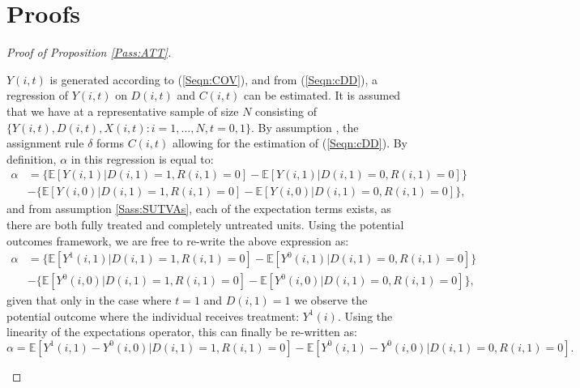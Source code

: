 \section{Proofs}
\renewcommand{\qedsymbol}{$\blacksquare$}
\begin{proof}[Proof of Proposition \ref{Pass:ATT}]
\begin{footnotesize}
$Y(i,t)$ is generated according to (\ref{Seqn:COV}), and from (\ref{Seqn:cDD}),
a regression of $Y(i,t)$ on $D(i,t)$ and $C(i,t)$ can be estimated.  It is 
assumed that we have at a representative sample of size $N$ consisting of 
$\{Y(i,t),D(i,t),X(i,t): i=1, \ldots, N, t=0, 1\}$.  By assumption 
, the assignment rule $\delta$ forms $C(i,t)$ allowing for 
the estimation of (\ref{Seqn:cDD}). By definition, $\alpha$ in this regression 
is equal to:
\begin{equation}
\nonumber
\label{Seqn:alphaProof1}
\begin{split}
\alpha&=\{\mathbb{E}[Y(i,1)|D(i,1)=1,R(i,1)=0]-\mathbb{E}[Y(i,1)|D(i,1)=0,R(i,1)=0]\} \\
      &-\{\mathbb{E}[Y(i,0)|D(i,1)=1,R(i,1)=0]-\mathbb{E}[Y(i,0)|D(i,1)=0,R(i,1)=0]\},
\end{split}
\end{equation}
and from assumption \ref{Sass:SUTVAs}, each of the expectation terms exists, as 
there are both fully treated and completely untreated units. Using the potential 
outcomes framework, we are free to re-write the above expression as:
\begin{equation}
\nonumber
\label{Seqn:alphaProof2}
\begin{split}
\alpha&=\{\mathbb{E}[Y^1(i,1)|D(i,1)=1,R(i,1)=0]-\mathbb{E}[Y^0(i,1)|D(i,1)=0,R(i,1)=0]\} \\
      &-\{\mathbb{E}[Y^0(i,0)|D(i,1)=1,R(i,1)=0]-\mathbb{E}[Y^0(i,0)|D(i,1)=0,R(i,1)=0]\},
\end{split}
\end{equation}
given that only in the case where $t=1$ and $D(i,1)=1$ we observe the potential 
outcome where the individual receives treatment: $Y^1(i)$.  Using the linearity
of the expectations operator, this can finally be re-written as:
\begin{equation}
\nonumber
\label{Seqn:alphaProof3}
\alpha=\mathbb{E}[Y^1(i,1)-Y^0(i,0)|D(i,1)=1,R(i,1)=0] - 
       \mathbb{E}[Y^0(i,1)-Y^0(i,0)|D(i,1)=0,R(i,1)=0].
\end{equation}


\end{footnotesize}
\end{proof}
